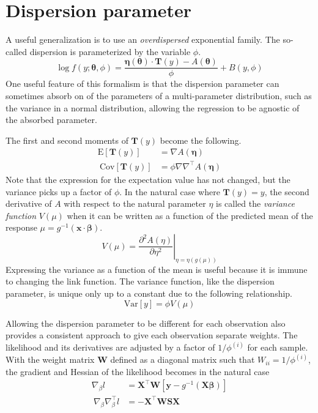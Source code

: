 \documentclass{article}
\newcommand{\bbeta}{\boldsymbol{\beta}}
\begin{document}
\section{Dispersion parameter}

A useful generalization is to use an \emph{overdispersed} exponential family. The
so-called dispersion is parameterized by the variable \(\phi\).
\[ \log f(y; \boldsymbol{\theta}, \phi) = \frac{\boldsymbol{\eta}(\boldsymbol{\theta})
		\cdot \mathbf{T}(y) - A(\boldsymbol{\theta})}{\phi} + B(y, \phi) \]
One useful feature of this formalism is that the dispersion parameter can
sometimes absorb on of the parameters of a multi-parameter distribution, such as
the variance in a normal distribution, allowing the regression to be agnostic of
the absorbed parameter.

The first and second moments of \(\mathbf{T}(y)\) become the following.
\begin{align}
	\textrm{E}[\mathbf{T}(y)]   & = \nabla A(\boldsymbol{\eta})                       \\\
	\textrm{Cov}[\mathbf{T}(y)] & = \phi \nabla \nabla^\intercal A(\boldsymbol{\eta})
\end{align}
Note that the expression for the expectation value has not changed, but the
variance picks up a factor of \(\phi\). In the natural case where
\(\mathbf{T}(y) = y\), the second derivative of \(A\) with respect to the
natural parameter \(\eta\) is called the \emph{variance function} \(V(\mu)\) when
it can be written as a function of the predicted mean of the response \(\mu =
g^{-1}(\mathbf{x}\cdot\bbeta)\).
\[ V(\mu) = \left. \frac{\partial^2 A(\eta)}{\partial \eta^2} \right|_{\eta = \eta(g(\mu))} \]
Expressing the variance as a function of the mean is useful because it is immune
to changing the link function.
The variance function, like the dispersion parameter, is unique only up to a
constant due to the following relationship.
\[ \textrm{Var}[y] = \phi V(\mu) \]

Allowing the dispersion parameter to be different for each observation also
provides a consistent approach to give each observation separate weights. The
likelihood and its derivatives are adjusted by a factor of \(1/\phi^{(i)}\)
for each sample. With the weight matrix \(\mathbf{W}\) defined as a diagonal
matrix such that \( W_{ii} = 1/\phi^{(i)} \), the gradient and Hessian
of the likelihood becomes in the natural case
\begin{align}
	\nabla_\beta l                        & = \mathbf{X}^\intercal \mathbf{W} \left[ \mathbf{y} -
		g^{-1}(\mathbf{X}\bbeta) \right]                                                                  \\\
	\nabla_\beta \nabla_\beta^\intercal l & = - \mathbf{X}^\intercal \mathbf{W} \mathbf{S} \mathbf{X}
\end{align}
\end{document}
